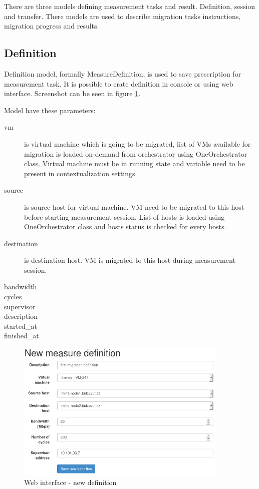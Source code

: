 
There are three models defining measurement tasks and result. Definition, session and transfer. There models are used to describe migration tasks instructions, migration progress and results. 



\subsection{Definition}
Definition model, formally MeasureDefinition, is used to save prescription for measurement task. It is possible to crate definition in console or using web interface. Screenshot can be seen in figure \ref{img:web-new-definition}.

Model have these parameters:
\begin{description}
	\item[vm] is virtual machine which is going to be migrated, list of \Ac{VM}s available for migration is loaded on-demand from orchestrator using OneOrchestrator class. Virtual machine must be in running state and variable  need to be present in contextualization settings.
	\item[source] is source host for virtual machine. \Ac{VM} need to be migrated to this host before starting measurement session. List of hosts is loaded using OneOrchestrator class and hosts status is checked for every hosts.
	\item[destination] is destination host. \Ac{VM} is migrated to this host during measurement session.
	\item[bandwidth] 
	\item[cycles]
	\item[supervisor]
	\item[description]

	\item[started\_at]
	\item[finished\_at]
\end{description}



\begin{figure}[htb]
	\begin{center}
	\includegraphics[width=0.9\textwidth]{form_measure_definition_new.png}
	\end{center}
	\caption{Web interface - new definition}
	\label{img:web-new-definition}
\end{figure}

